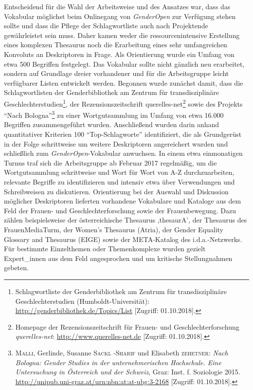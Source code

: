 \documentclass[a4paper,
fontsize=11pt,
oneside,
numbers=noperiodatend,
parskip=half-,
bibliography=totoc,
final
]{scrartcl}
\begin{document}
Entscheidend für die Wahl der Arbeitsweise und des Ansatzes war, dass
das Vokabular möglichst beim Onlinegang von \emph{GenderOpen} zur
Verfügung stehen sollte und dass die Pflege der Schlagwortliste auch
nach Projektende gewährleistet sein muss. Daher kamen weder die
ressourcenintensive Erstellung eines komplexen Thesaurus noch die
Erarbeitung eines sehr umfangreichen Konvoluts an Deskriptoren in Frage.
Als Orientierung wurde ein Umfang von etwa 500 Begriffen festgelegt. Das
Vokabular sollte nicht gänzlich neu erarbeitet, sondern auf Grundlage
dreier vorhandener und für die Arbeitsgruppe leicht verfügbarer Listen
entwickelt werden. Begonnen wurde zunächst damit, dass die
Schlagwortlisten der Genderbibliothek am Zentrum für transdisziplinäre
Geschlechterstudien\footnote{Schlagwortliste der Genderbibliothek am
  Zentrum für transdisziplinäre Geschlechterstudien
  (Humboldt-Universität): \url{http://genderbibliothek.de/Topics/List}
  {[}Zugriff: 01.10.2018{]}.}, der Rezensionszeitschrift
querelles-net\footnote{Homepage der Rezensionszeitschrift für Frauen-
  und Geschlechterforschung \emph{querelles-net}:
  \url{http://www.querelles-net.de} {[}Zugriff: 01.10.2018{]}.} sowie
des Projekts \enquote{Nach Bologna}\footnote{\textsc{Malli}, Gerlinde,
  Susanne \textsc{Sackl} -\textsc{Sharif} und Elisabeth
  \textsc{zehetner}: \emph{Nach Bologna: Gender Studies in der
  unternehmerischen Hochschule. Eine Untersuchung in Österreich und der
  Schweiz}, Graz: Inst. f. Soziologie 2015.
  \url{http://unipub.uni-graz.at/urn:nbn:at:at-ubg:3-2168} {[}Zugriff:
  01.10.2018{]}.} zu einer Wortgutsammlung im Umfang von etwa 16.000
Begriffen zusammengeführt wurden. Anschließend wurden darin anhand
quantitativer Kriterien 100 \enquote{Top-Schlagworte} identifiziert, die
als Grundgerüst in der Folge schrittweise um weitere Deskriptoren
angereichert wurden und schließlich zum \emph{GenderOpen}-Vokabular
anwuchsen. In einem etwa einmonatigen Turnus traf sich die Arbeitsgruppe
ab Februar 2017 regelmäßig, um die Wortgutsammlung schrittweise und Wort
für Wort von A-Z durchzuarbeiten, relevante Begriffe zu identifizieren
und intensiv etwa über Verwendungen und Schreibweisen zu diskutieren.
Orientierung bei der Auswahl und Diskussion möglicher Deskriptoren
lieferten vorhandene Vokabulare und Kataloge aus dem Feld der Frauen-
und Geschlechterforschung sowie der Frauenbewegung. Dazu zählen
beispielsweise der österreichische Thesaurus ‚thesaurA', der Thesaurus
des FrauenMediaTurm, der Women's Thesaurus (Atria), der Gender Equality
Glossary and Thesaurus (EIGE) sowie der META-Katalog des
i.d.a.-Netzwerks. Für bestimmte Einzelthemen oder Themenkomplexe wurden
gezielt Expert\_innen aus dem Feld angesprochen und um kritische
Stellungnahmen gebeten.
\end{document}
